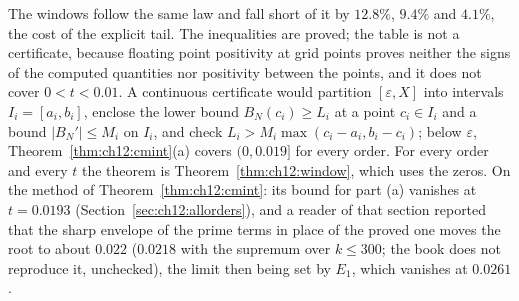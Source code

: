 The windows follow the same law and fall short of it by $12.8\%$, $9.4\%$ and $4.1\%$, the cost of the explicit tail. The inequalities are proved; the table is not a certificate, because floating point positivity at grid points proves neither the signs of the computed quantities nor positivity between the points, and it does not cover $0<t<0.01$. A continuous certificate would partition $[\varepsilon,X]$ into intervals $I_i=[a_i,b_i]$, enclose the lower bound $B_N(c_i)\ge L_i$ at a point $c_i\in I_i$ and a bound $|B_N'|\le M_i$ on $I_i$, and check $L_i>M_i\max(c_i-a_i,b_i-c_i)$; below $\varepsilon$, Theorem~\ref{thm:ch12:cmint}(a) covers $(0,0.019]$ for every order. For every order and every $t$ the theorem is Theorem~\ref{thm:ch12:window}, which uses the zeros. On the method of Theorem~\ref{thm:ch12:cmint}: its bound for part (a) vanishes at $t=0.0193$ (Section~\ref{sec:ch12:allorders}), and a reader of that section reported that the sharp envelope of the prime terms in place of the proved one moves the root to about $0.022$ ($0.0218$ with the supremum over $k\le300$; the book does not reproduce it, unchecked), the limit then being set by $E_1$, which vanishes at $0.0261$.
